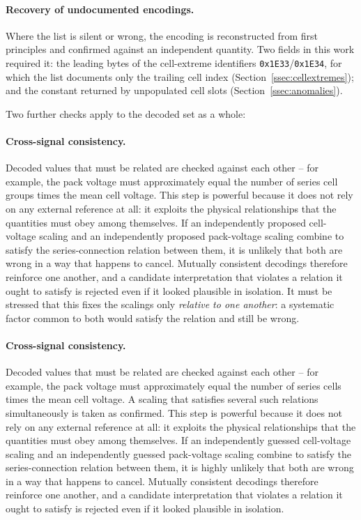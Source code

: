 \documentclass[11pt,a4paper,oneside,parskip=half]{scrreprt}
\providecommand{\hex}{}\renewcommand{\hex}[1]{\texttt{0x#1}}
\begin{document}
\paragraph{Recovery of undocumented encodings.} Where the list is silent or wrong, the encoding is reconstructed from first principles and confirmed against an independent quantity. Two fields in this work required it: the leading bytes of the cell-extreme identifiers \hex{1E33}/\hex{1E34}, for which the list documents only the trailing cell index (Section~\ref{ssec:cellextremes}); and the constant returned by unpopulated cell slots (Section~\ref{ssec:anomalies}).

\noindent Two further checks apply to the decoded set as a whole:

\paragraph{Cross-signal consistency.} Decoded values that must be related are checked against each other -- for example, the pack voltage must approximately equal the number of series cell groups times the mean cell voltage. This step is powerful because it does not rely on any external reference at all: it exploits the physical relationships that the quantities must obey among themselves. If an independently proposed cell-voltage scaling and an independently proposed pack-voltage scaling combine to satisfy the series-connection relation between them, it is unlikely that both are wrong in a way that happens to cancel. Mutually consistent decodings therefore reinforce one another, and a candidate interpretation that violates a relation it ought to satisfy is rejected even if it looked plausible in isolation. It must be stressed that this fixes the scalings only \emph{relative to one another}: a systematic factor common to both would satisfy the relation and still be wrong.

\paragraph{Cross-signal consistency.} Decoded values that must be related are checked against each other -- for example, the pack voltage must approximately equal the number of series cells times the mean cell voltage. A scaling that satisfies several such relations simultaneously is taken as confirmed. This step is powerful because it does not rely on any external reference at all: it exploits the physical relationships that the quantities must obey among themselves. If an independently guessed cell-voltage scaling and an independently guessed pack-voltage scaling combine to satisfy the series-connection relation between them, it is highly unlikely that both are wrong in a way that happens to cancel. Mutually consistent decodings therefore reinforce one another, and a candidate interpretation that violates a relation it ought to satisfy is rejected even if it looked plausible in isolation.
\end{document}
